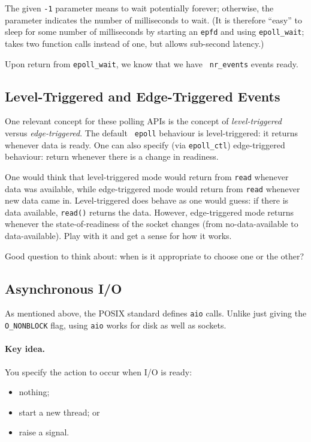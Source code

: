 \documentclass[a4paper]{report}
\begin{document}
The given {\tt -1} parameter means to wait potentially forever;
otherwise, the parameter indicates the number of milliseconds to wait.
(It is therefore ``easy'' to sleep for some number of milliseconds by
starting an {\tt epfd} and using {\tt epoll\_wait}; takes two function
calls instead of one, but allows sub-second latency.)

Upon return from {\tt epoll\_wait}, we know that we have {\tt
  nr\_events} events ready.

\subsection*{Level-Triggered and Edge-Triggered Events}
One relevant concept for these polling APIs is the concept of
\emph{level-triggered} versus \emph{edge-triggered}.  The default {\tt
  epoll} behaviour is level-triggered: it returns whenever data is
ready. One can also specify (via {\tt epoll\_ctl}) edge-triggered
behaviour: return whenever there is a change in readiness.


One would think that level-triggered mode would return from {\tt read}
whenever data was available, while edge-triggered mode would return
from {\tt read} whenever new data came in. Level-triggered does behave
as one would guess: if there is data available, {\tt read()} returns
the data. However, edge-triggered mode returns whenever the
state-of-readiness of the socket changes (from no-data-available to
data-available). Play with it and get a sense for how it works.

Good question to think about: when is it appropriate to choose one or the other?

\subsection*{Asynchronous I/O}
As mentioned above, the POSIX standard defines {\tt aio} calls.
Unlike just giving the {\tt O\_NONBLOCK} flag, using {\tt aio} works
for disk as well as sockets.

\paragraph{Key idea.} You specify the action to occur when I/O is ready:
    \begin{itemize}
      \item nothing;
      \item start a new thread; or
      \item raise a signal.
    \end{itemize}
\end{document}
